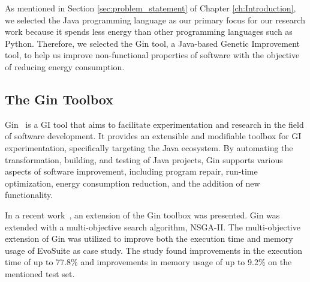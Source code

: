 \vspace{.5em}
As mentioned in Section \ref{sec:problem_statement} of Chapter \ref{ch:Introduction}, we selected the Java programming language as our primary focus for our research work because it spends less energy than other programming languages such as Python. Therefore, 
we selected the Gin tool, a Java-based Genetic Improvement tool, to help us improve non-functional properties of software with the objective of reducing energy consumption. 

\subsection{The Gin Toolbox}
\label{subsection:Gin_Tool}


Gin~\cite{DBLP:conf/gecco/BrownleePABWW19} is a GI tool that aims to facilitate experimentation and research in the field of software development. It provides an extensible and modifiable toolbox for GI experimentation, specifically targeting the Java ecosystem. By automating the transformation, building, and testing of Java projects, Gin supports various aspects of software improvement, including program repair, run-time optimization, energy consumption reduction, and the addition of new functionality. 

\vspace{.5em}
In a recent work~\cite{DBLP:conf/ssbse/CallanP22},  
an extension of the Gin toolbox was presented.
Gin was extended with a multi-objective search algorithm, \ie NSGA-II. 
The multi-objective extension of Gin was utilized to improve both the execution time and memory usage of EvoSuite as case study. The study found improvements in the execution time of up to 77.8\% and improvements in memory usage of up to 9.2\% on the mentioned test set.

